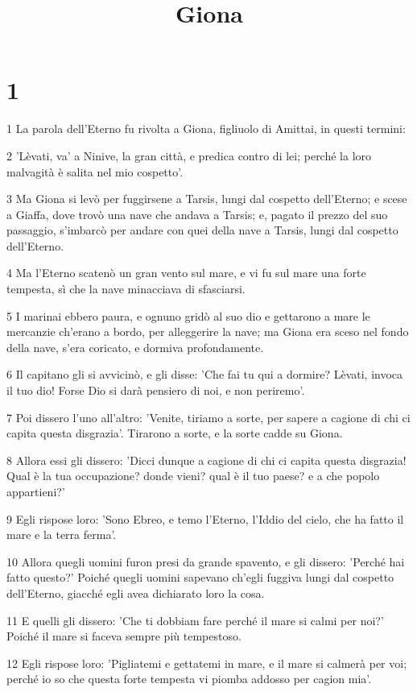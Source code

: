 

\title{Giona}


\chapter{1}

\par 1 La parola dell'Eterno fu rivolta a Giona, figliuolo di Amittai, in questi termini:
\par 2 'Lèvati, va' a Ninive, la gran città, e predica contro di lei; perché la loro malvagità è salita nel mio cospetto'.
\par 3 Ma Giona si levò per fuggirsene a Tarsis, lungi dal cospetto dell'Eterno; e scese a Giaffa, dove trovò una nave che andava a Tarsis; e, pagato il prezzo del suo passaggio, s'imbarcò per andare con quei della nave a Tarsis, lungi dal cospetto dell'Eterno.
\par 4 Ma l'Eterno scatenò un gran vento sul mare, e vi fu sul mare una forte tempesta, sì che la nave minacciava di sfasciarsi.
\par 5 I marinai ebbero paura, e ognuno gridò al suo dio e gettarono a mare le mercanzie ch'erano a bordo, per alleggerire la nave; ma Giona era sceso nel fondo della nave, s'era coricato, e dormiva profondamente.
\par 6 Il capitano gli si avvicinò, e gli disse: 'Che fai tu qui a dormire? Lèvati, invoca il tuo dio! Forse Dio si darà pensiero di noi, e non periremo'.
\par 7 Poi dissero l'uno all'altro: 'Venite, tiriamo a sorte, per sapere a cagione di chi ci capita questa disgrazia'. Tirarono a sorte, e la sorte cadde su Giona.
\par 8 Allora essi gli dissero: 'Dicci dunque a cagione di chi ci capita questa disgrazia! Qual è la tua occupazione? donde vieni? qual è il tuo paese? e a che popolo appartieni?'
\par 9 Egli rispose loro: 'Sono Ebreo, e temo l'Eterno, l'Iddio del cielo, che ha fatto il mare e la terra ferma'.
\par 10 Allora quegli uomini furon presi da grande spavento, e gli dissero: 'Perché hai fatto questo?' Poiché quegli uomini sapevano ch'egli fuggiva lungi dal cospetto dell'Eterno, giacché egli avea dichiarato loro la cosa.
\par 11 E quelli gli dissero: 'Che ti dobbiam fare perché il mare si calmi per noi?' Poiché il mare si faceva sempre più tempestoso.
\par 12 Egli rispose loro: 'Pigliatemi e gettatemi in mare, e il mare si calmerà per voi; perché io so che questa forte tempesta vi piomba addosso per cagion mia'.
